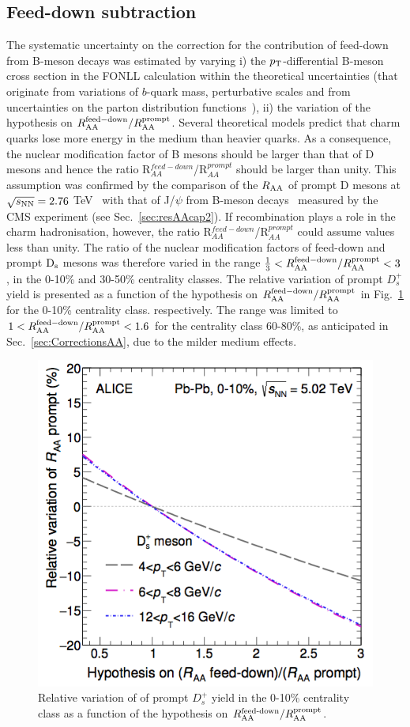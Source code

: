 \subsection{Feed-down subtraction}
\label{sec:FDsystAA}
The systematic uncertainty on the correction for the contribution of feed-down from 
B-meson decays was estimated by varying i)
the $p_{\rm T}$-differential B-meson cross section in the 
FONLL calculation within the theoretical uncertainties (that originate from variations of 
$b$-quark mass, perturbative scales and from uncertainties on the parton distribution functions~\cite{Cacciari:2012ny}), 
ii) the variation of the hypothesis on $R_{\rm AA}^{\rm  feed-down}/R_{\rm AA}^{\rm prompt} $. 
Several theoretical models predict that charm quarks lose more energy 
in the medium than heavier quarks. As a consequence, the nuclear modification 
factor of B mesons should be larger than that of D mesons and hence the ratio 
R$^{feed-down}_{AA}$/R$^{prompt}_{AA}$ should be larger than unity. 
This assumption was confirmed by the comparison of the $R_{\rm AA}$ of prompt D mesons at 
$\sqrt{s_{\rm NN}} = 2.76$ TeV~\cite{Adam:2015nna} with that of J/$\psi$ from B-meson decays~\cite{Khachatryan:2016ypw} 
measured by the CMS experiment (see Sec.~\ref{sec:resAAcap2}).
If recombination plays a role in the charm hadronisation, however,  
the ratio R$^{feed-down}_{AA}$/R$^{prompt}_{AA} $ could assume values 
less than unity. The ratio of the nuclear modification factors of feed-down and 
prompt ${\rm D_s}$ mesons was therefore varied in the range 
$\frac{1}{3} < R_{\rm AA}^{\rm  feed-down}/R_{\rm AA}^{\rm prompt} < 3$, in 
the 0-10\% and 30-50\% centrality classes.
The relative variation of prompt $D^+_s$ yield is presented as a function of the hypothesis on  
$R_{\rm AA}^{\rm  feed-down}/R_{\rm AA}^{\rm prompt}$ in Fig.~\ref{fig:promptAA}
for the 0-10\% centrality class. 
respectively. The range was limited to 
$1 < R_{\rm AA}^{\rm  feed-down} / R_{\rm AA}^{\rm prompt} < 1.6$ 
for the centrality class 60-80\%, as anticipated in Sec.~\ref{sec:CorrectionsAA},
due to the milder medium effects.
\begin{figure}[!h]
 \begin{center}
\includegraphics[width=.49\textwidth]{./FigCap5/RaaVariationVsRbHypo.png}
\end{center}
 \caption{Relative variation of of prompt $D^+_s$ yield in the 0-10\% centrality class as a function of the hypothesis on $R_{\rm AA}^{\textnormal{feed-down}}/R_{\rm AA}^{\rm prompt}$.}
 \label{fig:promptAA}
\end{figure}


